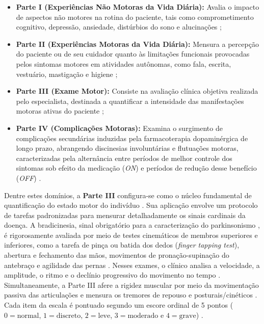 \begin{itemize} 
    \item \textbf{Parte I (Experiências Não Motoras da Vida Diária):} Avalia o impacto de aspectos não motores na rotina do paciente, tais como comprometimento cognitivo, depressão, ansiedade, distúrbios do sono e alucinações \cite{Santos2024, Goetz2008}; 
    \item \textbf{Parte II (Experiências Motoras da Vida Diária):} Mensura a percepção do paciente ou de seu cuidador quanto às limitações funcionais provocadas pelos sintomas motores em atividades autônomas, como fala, escrita, vestuário, mastigação e higiene \cite{Santos2024, Goetz2008}; 
    \item \textbf{Parte III (Exame Motor):} Consiste na avaliação clínica objetiva realizada pelo especialista, destinada a quantificar a intensidade das manifestações motoras ativas do paciente \cite{Santos2024, Goetz2008, Luiz2022}; 
    \item \textbf{Parte IV (Complicações Motoras):} Examina o surgimento de complicações secundárias induzidas pela farmacoterapia dopaminérgica de longo prazo, abrangendo discinesias involuntárias e flutuações motoras, caracterizadas pela alternância entre períodos de melhor controle dos sintomas sob efeito da medicação (\textit{ON}) e períodos de redução desse benefício (\textit{OFF}) \cite{Santos2024, Goetz2008}.
\end{itemize} 

Dentre estes domínios, a \textbf{Parte III} configura-se como o núcleo fundamental de quantificação do estado motor do indivíduo \cite{Lima2023, Luiz2022}. Sua aplicação envolve um protocolo de tarefas padronizadas para mensurar detalhadamente os sinais cardinais da doença. A bradicinesia, sinal obrigatório para a caracterização do parkinsonismo \cite{Lima2023, Cabreira2019}, é rigorosamente avaliada por meio de testes cinemáticos de membros superiores e inferiores, como a tarefa de pinça ou batida dos dedos (\textit{finger tapping test}), abertura e fechamento das mãos, movimentos de pronação-supinação do antebraço e agilidade das pernas \cite{Lima2023, Luiz2022}. Nesses exames, o clínico analisa a velocidade, a amplitude, o ritmo e o declínio progressivo do movimento no tempo \cite{Lima2023, Luiz2022}. Simultaneamente, a Parte III afere a rigidez muscular por meio da movimentação passiva das articulações e mensura os tremores de repouso e posturais/cinéticos \cite{Santos2024, Goetz2008}. Cada item da escala é pontuado segundo um escore ordinal de 5 pontos ($0 = \text{normal}$, $1 = \text{discreto}$, $2 = \text{leve}$, $3 = \text{moderado}$ e $4 = \text{grave}$) \cite{Santos2024, Goetz2008, Luiz2022}. 

